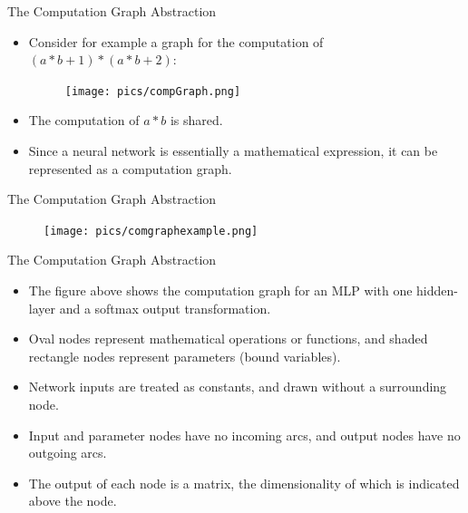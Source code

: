 \documentclass[handout]{beamer}
\begin{document}
\begin{frame}{The Computation Graph Abstraction}
\begin{scriptsize}
\begin{itemize}

\item Consider for example a graph for the computation of $(a*b+1)*(a*b+2)$:

\begin{figure}[htb]
	\centering
	 \texttt{[image: pics/compGraph.png]}
\end{figure}

\item The computation of $a*b$ is shared.

\item Since a neural network is essentially a mathematical expression, it can be represented as a computation graph.

\end{itemize}
\end{scriptsize}
\end{frame}




\begin{frame}{The Computation Graph Abstraction}
\begin{scriptsize}

\begin{figure}[htb]
	\centering
	 \texttt{[image: pics/comgraphexample.png]}
\end{figure}


\end{scriptsize}
\end{frame}


\begin{frame}{The Computation Graph Abstraction}
\begin{scriptsize}
\begin{itemize}

\item The figure above shows the computation graph for an MLP with one hidden-layer and a softmax output transformation.


\item Oval nodes represent mathematical operations or functions, and shaded rectangle nodes represent parameters (bound variables).

\item Network inputs are treated as constants, and drawn without a surrounding node. 

\item Input and parameter nodes have no incoming arcs, and output nodes have no outgoing arcs. 

\item The output of each node is a matrix, the dimensionality of which is indicated above the node.


\end{itemize}
\end{scriptsize}
\end{frame}
\end{document}
